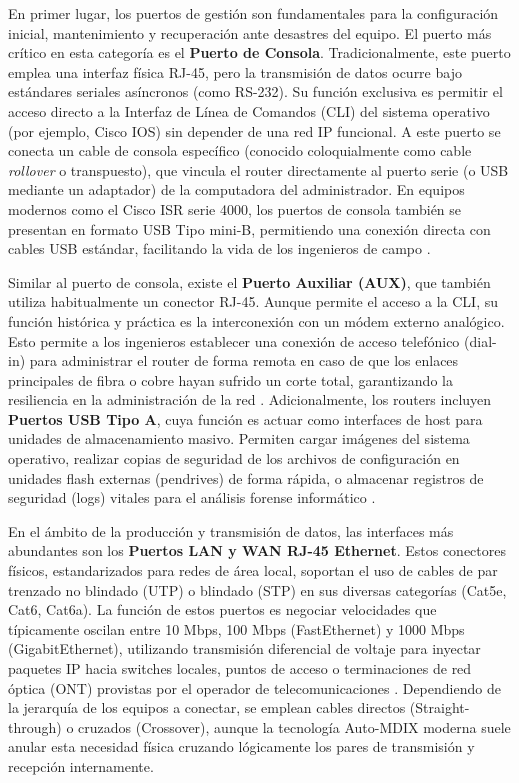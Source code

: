 \documentclass[a4paper,12pt]{article}
\begin{document}
En primer lugar, los puertos de gestión son fundamentales para la configuración inicial, mantenimiento y recuperación ante desastres del equipo. El puerto más crítico en esta categoría es el \textbf{Puerto de Consola}. Tradicionalmente, este puerto emplea una interfaz física RJ-45, pero la transmisión de datos ocurre bajo estándares seriales asíncronos (como RS-232). Su función exclusiva es permitir el acceso directo a la Interfaz de Línea de Comandos (CLI) del sistema operativo (por ejemplo, Cisco IOS) sin depender de una red IP funcional. A este puerto se conecta un cable de consola específico (conocido coloquialmente como cable \textit{rollover} o transpuesto), que vincula el router directamente al puerto serie (o USB mediante un adaptador) de la computadora del administrador. En equipos modernos como el Cisco ISR serie 4000, los puertos de consola también se presentan en formato USB Tipo mini-B, permitiendo una conexión directa con cables USB estándar, facilitando la vida de los ingenieros de campo \cite{cisco_4331_manual}.

Similar al puerto de consola, existe el \textbf{Puerto Auxiliar (AUX)}, que también utiliza habitualmente un conector RJ-45. Aunque permite el acceso a la CLI, su función histórica y práctica es la interconexión con un módem externo analógico. Esto permite a los ingenieros establecer una conexión de acceso telefónico (dial-in) para administrar el router de forma remota en caso de que los enlaces principales de fibra o cobre hayan sufrido un corte total, garantizando la resiliencia en la administración de la red \cite{cisco_4331_manual}. Adicionalmente, los routers incluyen \textbf{Puertos USB Tipo A}, cuya función es actuar como interfaces de host para unidades de almacenamiento masivo. Permiten cargar imágenes del sistema operativo, realizar copias de seguridad de los archivos de configuración en unidades flash externas (pendrives) de forma rápida, o almacenar registros de seguridad (logs) vitales para el análisis forense informático \cite{cisco_4331_manual, router_ports_guide}.

En el ámbito de la producción y transmisión de datos, las interfaces más abundantes son los \textbf{Puertos LAN y WAN RJ-45 Ethernet}. Estos conectores físicos, estandarizados para redes de área local, soportan el uso de cables de par trenzado no blindado (UTP) o blindado (STP) en sus diversas categorías (Cat5e, Cat6, Cat6a). La función de estos puertos es negociar velocidades que típicamente oscilan entre 10 Mbps, 100 Mbps (FastEthernet) y 1000 Mbps (GigabitEthernet), utilizando transmisión diferencial de voltaje para inyectar paquetes IP hacia switches locales, puntos de acceso o terminaciones de red óptica (ONT) provistas por el operador de telecomunicaciones \cite{ethernet_ports_dell}. Dependiendo de la jerarquía de los equipos a conectar, se emplean cables directos (Straight-through) o cruzados (Crossover), aunque la tecnología Auto-MDIX moderna suele anular esta necesidad física cruzando lógicamente los pares de transmisión y recepción internamente.
\end{document}

